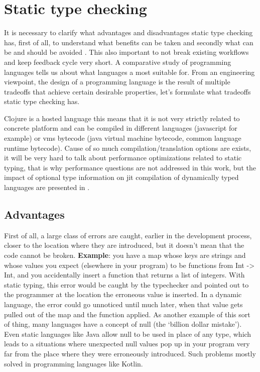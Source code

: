 \section{Static type checking}
\label{sec:statictypechecking}
It is necessary to clarify what advantages and disadvantages static type
checking has, first of all, to understand what benefits can be taken and
secondly what can be and should be avoided \cite{staticvsdynamic}. This also
important to not break existing workflows and keep feedback cycle very short. A
comparative study of programming languages \cite{nanz2015comparative} tells us
about what languages a most suitable for. From an engineering viewpoint, the
design of a programming language is the result of multiple tradeoffs that
achieve certain desirable properties, let's formulate what tradeoffs static type
checking has.

Clojure is a hosted language this means that it is not very strictly related to
concrete platform and can be compiled in different languages (javascript for
example) or vms bytecode (java virtual machine bytecode, common language runtime
bytecode). Cause of so much compilation/translation options are exists, it will
be very hard to talk about performance optimizations related to static typing,
that is why performance questions are not addressed in this work, but the impact
of optional type information on jit compilation of dynamically typed languages
are presented in \cite{chang2011impact}.

\subsection{Advantages}
First of all, a large class of errors are caught, earlier in the development
process, closer to the location where they are introduced, but it doesn't mean
that the code cannot be broken. \textbf{Example}: you have a map whose keys are
strings and whose values you expect (elsewhere in your program) to be functions
from Int -> Int, and you accidentally insert a function that returns a list of
integers. With static typing, this error would be caught by the typechecker and
pointed out to the programmer at the location the erroneous value is inserted.
In a dynamic language, the error could go unnoticed until much later, when that
value gets pulled out of the map and the function applied. As another example of
this sort of thing, many languages have a concept of null (the ‘billion dollar
mistake’). Even static languages like Java allow null to be used in place of any
type, which leads to a situations where unexpected null values pop up in your
program very far from the place where they were erroneously introduced. Such
problems mostly solved in programming languages like Kotlin.

